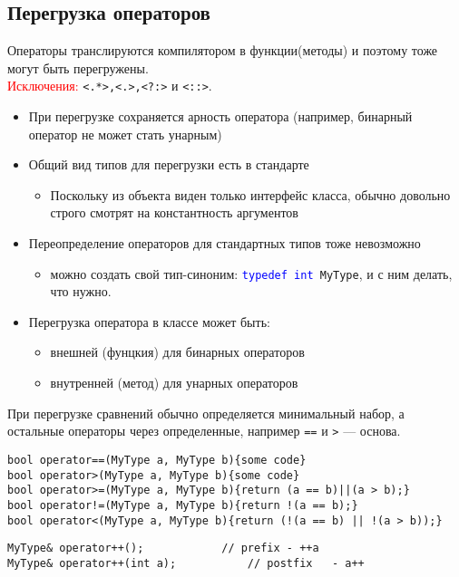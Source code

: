 \documentclass {article}
\begin{document}
\subsection{Перегрузка операторов}
Операторы транслируются компилятором в функции(методы) и поэтому тоже могут быть перегружены. \\
\textcolor{red}{Исключения:} \texttt{<.*>,<.>,<?:>} и \texttt{<::>}.
\begin {itemize}
	\item При перегрузке сохраняется арность оператора (например, бинарный оператор не может стать унарным)
	\item Общий вид типов для перегрузки есть в стандарте
	\begin{itemize}
		\item Поскольку из объекта виден только интерфейс класса, обычно довольно строго смотрят на константность аргументов
	\end{itemize}
	\item Переопределение операторов для стандартных типов тоже невозможно
	\begin{itemize}
		\item можно создать свой тип-синоним: \texttt{\textcolor{blue}{typedef int} MyType}, и с ним делать, что нужно.
	\end{itemize}
	\item Перегрузка оператора в классе может быть:
	\begin{itemize}
		\item внешней (фунцкия) для бинарных операторов
		\item внутренней (метод) для унарных операторов
	\end{itemize}
\end {itemize}
При перегрузке сравнений обычно определяется минимальный набор, а остальные операторы через определенные, например \texttt{==} и \texttt{>} --- основа.
\begin{lstlisting}[caption=Перегрузка сравнений]
bool operator==(MyType a, MyType b){some code}
bool operator>(MyType a, MyType b){some code}
bool operator>=(MyType a, MyType b){return (a == b)||(a > b);}
bool operator!=(MyType a, MyType b){return !(a == b);}
bool operator<(MyType a, MyType b){return (!(a == b) || !(a > b));}
\end{lstlisting}
\begin{lstlisting}[caption=Перегрузка инкремента и декремента]
MyType& operator++();            // prefix - ++a
MyType& operator++(int a);           // postfix   - a++
\end{lstlisting}
\end{document}
